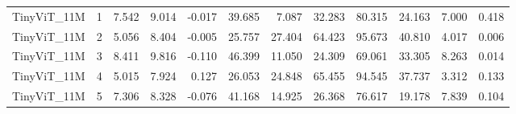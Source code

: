 \begin{table}[htbp]
\begin{tabular}{lrrrrrrrrrrr}
TinyViT\_11M & 1 & 7.542 & 9.014 & -0.017 & 39.685 & 7.087 & 32.283 & 80.315 & 24.163 & 7.000 & 0.418 \\
TinyViT\_11M & 2 & 5.056 & 8.404 & -0.005 & 25.757 & 27.404 & 64.423 & 95.673 & 40.810 & 4.017 & 0.006 \\
TinyViT\_11M & 3 & 8.411 & 9.816 & -0.110 & 46.399 & 11.050 & 24.309 & 69.061 & 33.305 & 8.263 & 0.014 \\
TinyViT\_11M & 4 & 5.015 & 7.924 & 0.127 & 26.053 & 24.848 & 65.455 & 94.545 & 37.737 & 3.312 & 0.133 \\
TinyViT\_11M & 5 & 7.306 & 8.328 & -0.076 & 41.168 & 14.925 & 26.368 & 76.617 & 19.178 & 7.839 & 0.104 \\
\bottomrule
\end{tabular}
\end{table}
